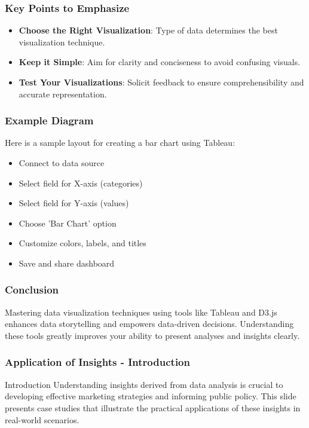 \documentclass{beamer}
\begin{document}
\begin{frame}[fragile]
    \frametitle{Key Points to Emphasize}
    \begin{itemize}
        \item \textbf{Choose the Right Visualization}: Type of data determines the best visualization technique.
        \item \textbf{Keep it Simple}: Aim for clarity and conciseness to avoid confusing visuals.
        \item \textbf{Test Your Visualizations}: Solicit feedback to ensure comprehensibility and accurate representation.
    \end{itemize}
\end{frame}

\begin{frame}[fragile]
    \frametitle{Example Diagram}
    Here is a sample layout for creating a bar chart using Tableau:
    \begin{flushleft}
    \begin{itemize}
        \item Connect to data source
        \item Select field for X-axis (categories)
        \item Select field for Y-axis (values)
        \item Choose 'Bar Chart' option
        \item Customize colors, labels, and titles
        \item Save and share dashboard
    \end{itemize}
    \end{flushleft}
\end{frame}

\begin{frame}[fragile]
    \frametitle{Conclusion}
    Mastering data visualization techniques using tools like Tableau and D3.js enhances data storytelling and empowers data-driven decisions.
    Understanding these tools greatly improves your ability to present analyses and insights clearly.
\end{frame}

\begin{frame}[fragile]
    \frametitle{Application of Insights - Introduction}
    \begin{block}{Introduction}
        Understanding insights derived from data analysis is crucial to developing effective marketing strategies and informing public policy. This slide presents case studies that illustrate the practical applications of these insights in real-world scenarios.
    \end{block}
\end{frame}
\end{document}
